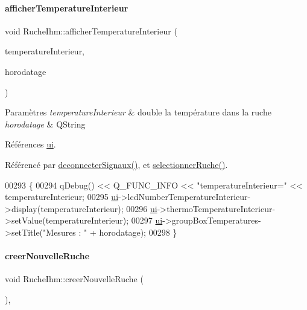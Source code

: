 \paragraph{\texorpdfstring{afficher\+Temperature\+Interieur}{afficherTemperatureInterieur}}
{\footnotesize\ttfamily void Ruche\+Ihm\+::afficher\+Temperature\+Interieur (\begin{DoxyParamCaption}\item[{double}]{temperature\+Interieur,  }\item[{Q\+String}]{horodatage }\end{DoxyParamCaption})\hspace{0.3cm}{\ttfamily [slot]}}


\begin{DoxyParams}{Paramètres}
{\em temperature\+Interieur} & double la température dans la ruche \\
\hline
{\em horodatage} & Q\+String \\
\hline
\end{DoxyParams}


Références \hyperlink{class_ruche_ihm_a64786058bd7f88ca2f1e9743bb27c25b}{ui}.



Référencé par \hyperlink{class_ruche_ihm_a348a76106f3072dd31a382c6025b8113}{deconnecter\+Signaux()}, et \hyperlink{class_ruche_ihm_a7324ae6ea574ccdad47783f466933157}{selectionner\+Ruche()}.


\begin{DoxyCode}
00293 \{
00294     qDebug() << Q\_FUNC\_INFO << \textcolor{stringliteral}{"temperatureInterieur="} << temperatureInterieur;
00295     \hyperlink{class_ruche_ihm_a64786058bd7f88ca2f1e9743bb27c25b}{ui}->lcdNumberTemperatureInterieur->display(temperatureInterieur);
00296     \hyperlink{class_ruche_ihm_a64786058bd7f88ca2f1e9743bb27c25b}{ui}->thermoTemperatureInterieur->setValue(temperatureInterieur);
00297     \hyperlink{class_ruche_ihm_a64786058bd7f88ca2f1e9743bb27c25b}{ui}->groupBoxTemperatures->setTitle(\textcolor{stringliteral}{"Mesures : "} + horodatage);
00298 \}
\end{DoxyCode}
\mbox{\label{class_ruche_ihm_a2a106515c13c06c51799432a1c2baa3b}} 
\paragraph{\texorpdfstring{creer\+Nouvelle\+Ruche}{creerNouvelleRuche}}
{\footnotesize\ttfamily void Ruche\+Ihm\+::creer\+Nouvelle\+Ruche (\begin{DoxyParamCaption}{ }\end{DoxyParamCaption})\hspace{0.3cm}{\ttfamily [private]}, {\ttfamily [slot]}}



